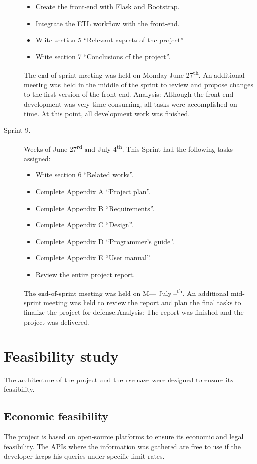 \begin{description}
\begin{itemize}
		\item Create the front-end with Flask and Bootstrap.
		\item Integrate the ETL workflow with the front-end.
		\item Write section 5 ``Relevant aspects of the project''.
		\item Write section 7 ``Conclusions of the project''.
	\end{itemize}
	The end-of-sprint meeting was held on Monday June 27\textsuperscript{th}. An additional meeting was held in the middle of the sprint to review and propose changes to the first version of the front-end. Analysis: Although the front-end development was very time-consuming, all tasks were accomplished on time. At this point, all development work was finished.
	\item[Sprint 9.] Weeks of June 27\textsuperscript{rd} and July 4\textsuperscript{th}. This Sprint had the following tasks assigned:
	\begin{itemize}
		\item Write section 6 ``Related works''.
		\item Complete Appendix A ``Project plan''.
		\item Complete Appendix B ``Requirements''.
		\item Complete Appendix C ``Design''.
		\item Complete Appendix D ``Programmer's guide''.
		\item Complete Appendix E ``User manual''.
		\item Review the entire project report.
	\end{itemize}
	The end-of-sprint meeting was held on M--- July --\textsuperscript{th}. An additional mid-sprint meeting was held to review the report and plan the final tasks to finalize the project for defense.Analysis: The report was finished and the project was delivered.
\end{description}

\section{Feasibility study}
\nonzeroparskip The architecture of the project and the use case were designed to ensure its feasibility.

\subsection{Economic feasibility}
\nonzeroparskip The project is based on open-source platforms to ensure its economic and legal feasibility. The APIs where the information was gathered are free to use if the developer keeps his queries under specific limit rates.

